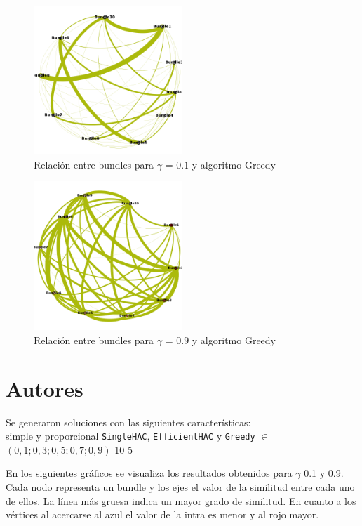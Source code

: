 \begin{figure}[H]
  \centering	
    \includegraphics[width=0.5\textwidth]{resultados/papers/intra_inter/greedy01.png}
  \caption{Relación entre bundles para $\gamma$ = $0.1$ y algoritmo Greedy}
  \label{res:img-papers-gamma01-greedy}
\end{figure}

\begin{figure}[H]
  \centering
    \includegraphics[width=0.5\textwidth]{resultados/papers/intra_inter/greedy09.png}
  \caption{Relación entre bundles para $\gamma$ = $0.9$ y algoritmo Greedy}
  \label{res:img-papers-gamma09-greedy}
\end{figure}

\section{Autores}
Se generaron soluciones con las siguientes características:\\
\Solucion
{}
{simple y proporcional}
{\texttt{SingleHAC}, \texttt{EfficientHAC} y \texttt{Greedy}}
{$\in$ $(0,1; 0,3; 0,5; 0,7; 0,9)$}
{10}
{5}

En los siguientes gráficos se visualiza los resultados obtenidos para $\gamma$ 0.1 y 0.9. Cada 
nodo representa un bundle y los ejes el valor de la similitud entre cada uno de ellos. La línea más 
gruesa indica un mayor grado de similitud. En cuanto a los vértices al acercarse al azul el valor 
de la intra es menor y al rojo mayor.

